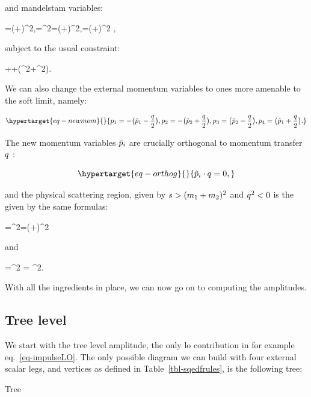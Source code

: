 \documentclass[
  10pt,
  a4paper,
  DIV=11,
  numbers=noendperiod,
  twoside]{scrreprt}
\let\[\relax \let\]\relax %
\DeclareRobustCommand{\[}{\begin{equation}}
\DeclareRobustCommand{\]}{\end{equation}}
\begin{document}
and mandelstam variables:

\[
 \mands=(\emom[1]+\emom[2])^2,\quad \mandt=\tm^2=(\emom[1]+\emom[4])^2,\quad \mandu=(\emom[1]+\emom[3])^2   ,
\]

subject to the usual constraint:

\[
\mands+\mandt+(\mass[1]^2+\mass[2]^2).
\]

We can also change the external momentum variables to ones more amenable
to the soft limit, namely:

\begin{equation}\protect\hypertarget{eq-newmom}{}{
\emom[1]=-\pa[\big]{\semom[1]-\Half[\tm]}, \emom[2]=-\pa[\big]{\semom[2]+\Half[\tm]}, \emom[3]=\pa[\big]{\semom[2]-\Half[\tm]}, \emom[4]=\pa[\big]{\semom[1]+\Half[\tm]} .
}\label{eq-newmom}\end{equation}

The new momentum variables \(\semom[i]\) are crucially orthogonal to
momentum transfer \(\tm\) :

\begin{equation}\protect\hypertarget{eq-orthog}{}{
\semom[i]\cdot\tm=0,
}\label{eq-orthog}\end{equation}

and the physical scattering region, given by
\(\mands>(\mass[1]+\mass[2])^2\) and \(\tm^2<0\) is the given by the
same formulas:

\[
\mands=\pa[\Big]{-\pa[\big]{\semom[1]-\Half[\tm]}-\pa[\big]{\semom[2]+\Half[\tm]}}^2=(\semom[1]+\semom[2])^2
\]

and

\[
\mandt=\pa[\Big]{-\pa[\big]{\semom[1]-\Half[\tm]}+\semom[1]+\Half[\tm]}^2 = \tm^2.
\]

With all the ingredients in place, we can now go on to computing the
amplitudes.

\hypertarget{tree-level}{%
\subsection{Tree level}\label{tree-level}}

We start with the tree level amplitude, the only \gls{lo} contribution
in for example eq.~\ref{eq-impulseLO}. The only possible diagram we can
build with four external scalar legs, and vertices as defined in
Table~\ref{tbl-sqedfrules}, is the following tree:

{
\makeatletter
\def\LT@makecaption#1#2#3{%
  \noalign{\smash{\hbox{\kern\textwidth\rlap{\kern\marginparsep
  \parbox[t]{\marginparwidth}{%
    \footnotesize{%
      \vspace{(1.1\baselineskip)}
    #1{#2: }\ignorespaces #3}}}}}}%
    }
\makeatother



Tree

}
\end{document}
